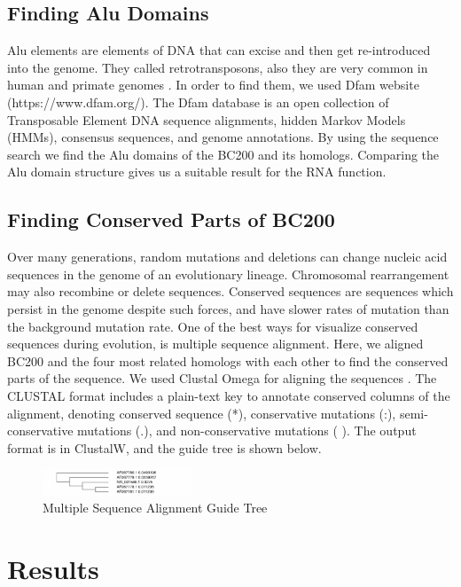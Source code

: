\documentclass[conference, 11pt]{IEEEtran}
\begin{document}
\subsection{Finding Alu Domains}

Alu elements are elements of DNA that can excise and then get re-introduced into the genome. 
They called retrotransposons, also they are very common in human and primate genomes \cite{dombroski1994vivo}. 
In order to find them, we used Dfam website (https://www.dfam.org/). 
The Dfam database is an open collection of Transposable Element DNA sequence alignments, hidden Markov Models (HMMs), consensus sequences, and genome annotations. 
By using the sequence search we find the Alu domains of the BC200 and its homologs. 
Comparing the Alu domain structure gives us a suitable result for the RNA function.

\subsection{Finding Conserved Parts of BC200}
Over many generations, random mutations and deletions can change nucleic acid sequences in the genome of an evolutionary lineage. 
Chromosomal rearrangement may also recombine or delete sequences. 
Conserved sequences are sequences which persist in the genome despite such forces, and have slower rates of mutation than the background mutation rate\cite{kimura1974some}.
One of the best ways for visualize conserved sequences during evolution, is multiple sequence alignment. 
Here, we aligned BC200 and the four most related homologs with each other to find the conserved parts of the sequence. 
We used Clustal Omega for aligning the sequences \cite{madeira2019embl}. 
The CLUSTAL format includes a plain-text key to annotate conserved columns of the alignment, denoting conserved sequence (*), conservative mutations (:), semi-conservative mutations (.), and non-conservative mutations ( ). 
The output format is in ClustalW, and the guide tree is shown below.

\begin{figure}[ht]
  \centering
  \label{fig:Guide-tree}
  \includegraphics[width=0.4\textwidth]{figs/guidetree.png}
  \caption{Multiple Sequence Alignment Guide Tree}
\end{figure}

\section{Results}\label{sec:results}
\end{document}
